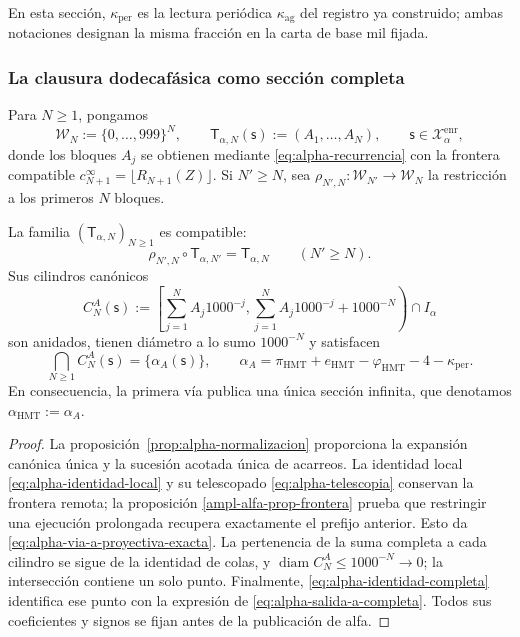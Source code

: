 En esta sección, \(\kappa_{\mathrm{per}}\) es la lectura periódica \(\kappa_{\mathrm{ag}}\) del registro ya construido; ambas notaciones designan la misma fracción en la carta de base mil fijada.

\subsubsection{La clausura dodecafásica como sección completa}

Para \(N\geq1\), pongamos
\[
 \mathcal W_N:=\{0,\ldots,999\}^{N},
 \qquad
 \mathsf T_{\alpha,N}(\mathsf s):=(A_1,\ldots,A_N),
 \qquad \mathsf s\in\mathcal X_{\alpha}^{\mathrm{enr}},
\]
donde los bloques \(A_j\) se obtienen mediante
\eqref{eq:alpha-recurrencia} con la frontera compatible
\(c_{N+1}^{\infty}=\lfloor R_{N+1}(Z)\rfloor\). Si \(N'\geq N\), sea
\(\rho_{N',N}:\mathcal W_{N'}\to\mathcal W_N\) la restricción a los
primeros \(N\) bloques.

\begin{theorem}
\label{thm:alpha-salida-dodecafasica-completa}
La familia \((\mathsf T_{\alpha,N})_{N\geq1}\) es compatible:
\begin{equation}
 \rho_{N',N}\circ\mathsf T_{\alpha,N'}
 =\mathsf T_{\alpha,N}
 \qquad(N'\geq N).
 \label{eq:alpha-via-a-proyectiva-exacta}
\end{equation}
Sus cilindros canónicos
\begin{equation}
 C_N^A(\mathsf s):=
 \left[
  \sum_{j=1}^{N}A_j1000^{-j},
  \sum_{j=1}^{N}A_j1000^{-j}+1000^{-N}
 \right)\cap I_\alpha
 \label{eq:alpha-cilindros-via-a-exactos}
\end{equation}
son anidados, tienen diámetro a lo sumo \(1000^{-N}\) y satisfacen
\begin{equation}
 \bigcap_{N\geq1}C_N^A(\mathsf s)
 =\{\alpha_A(\mathsf s)\},
 \qquad
 \alpha_A
 =\pi_{\mathrm{HMT}}+e_{\mathrm{HMT}}-\varphi_{\mathrm{HMT}}
  -4-\kappa_{\mathrm{per}}.
 \label{eq:alpha-salida-a-completa}
\end{equation}
En consecuencia, la primera vía publica una única sección infinita, que
denotamos \(\alpha_{\mathrm{HMT}}:=\alpha_A\).
\end{theorem}

\begin{proof}
La proposición~\ref{prop:alpha-normalizacion} proporciona la expansión
canónica única y la sucesión acotada única de acarreos. La identidad local
\eqref{eq:alpha-identidad-local} y su telescopado
\eqref{eq:alpha-telescopia} conservan la frontera remota; la proposición
\ref{ampl-alfa-prop-frontera} prueba que restringir una ejecución prolongada
recupera exactamente el prefijo anterior. Esto da
\eqref{eq:alpha-via-a-proyectiva-exacta}. La pertenencia de la suma completa
a cada cilindro se sigue de la identidad de colas, y
\(\operatorname{diam}C_N^A\leq1000^{-N}\to0\); la intersección contiene un
solo punto. Finalmente, \eqref{eq:alpha-identidad-completa} identifica ese
punto con la expresión de \eqref{eq:alpha-salida-a-completa}. Todos sus
coeficientes y signos se fijan antes de la publicación de alfa.
\end{proof}

